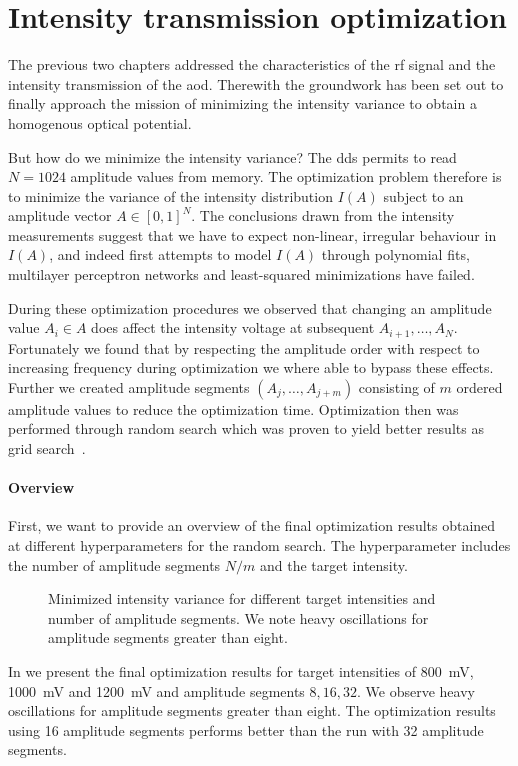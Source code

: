 \chapter{Intensity transmission optimization}

The previous two chapters addressed the characteristics of the \gls{rf}
signal and the intensity transmission of the \gls{aod}. Therewith the
groundwork has been set out to finally approach the mission of minimizing the
intensity variance to obtain a homogenous optical potential.

But how do we minimize the intensity variance? The \gls{dds} permits to read
$N=1024$ amplitude values from memory. The optimization problem therefore is to
minimize the variance of the intensity distribution $I(A)$ subject to an
amplitude vector $A\in{[0,1]}^N$. The conclusions drawn from the intensity
measurements suggest that we have to expect non-linear, irregular behaviour
in $I(A)$, and indeed first attempts to model $I(A)$ through polynomial fits,
multilayer perceptron networks and least-squared minimizations have failed.

During these optimization procedures we observed that changing an amplitude
value $A_i\in A$ does affect the intensity voltage at subsequent
$A_{i+1},\dots,A_N$. Fortunately we found that by respecting the amplitude
order with respect to increasing frequency during optimization we where able
to bypass these effects. Further we created amplitude segments
$\left(A_j,\dots,A_{j+m}\right)$ consisting of $m$ ordered amplitude values
to reduce the optimization time. Optimization then was performed through
random search which was proven to yield better results as grid
search~\cite{Bergstra2012}.

\subsubsection{Overview}

First, we want to provide an overview of the final optimization results
obtained at different hyperparameters for the random search. The
hyperparameter includes the number of amplitude segments $N/m$ and the target
intensity.
\begin{figure}[htb]
  \centering
  \begin{adjustbox}{width=\textwidth}
  \end{adjustbox}
  \caption{Minimized intensity variance for different target intensities
    and number of amplitude segments. We note heavy oscillations for
    amplitude segments greater than eight.
  }\label{fig:intensity_optimization_overview}
\end{figure}
In  we present the final
optimization results for target intensities of \SI{800}{\milli\volt},
\SI{1000}{\milli\volt} and \SI{1200}{\milli\volt} and amplitude segments
$8,16,32$. We observe heavy oscillations for amplitude segments greater than
eight. The optimization results using 16 amplitude segments performs better
than the run with 32 amplitude segments.

